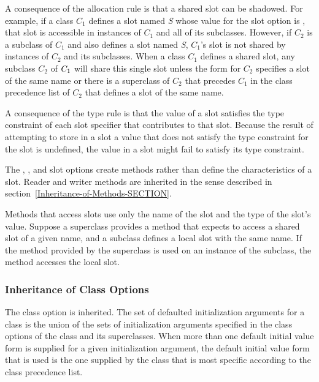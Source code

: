 A consequence of the allocation rule is that a shared slot can be
shadowed.  For example, if a class $C_1$ defines a slot named \emph{S}
whose value for the  slot option is ,
that slot is accessible in instances of $C_1$ and all of its
subclasses.  However, if $C_2$ is a subclass of $C_1$ and also
defines a slot named \emph{S}, $C_1$'s slot is not shared
by instances of $C_2$ and its subclasses. When a class
$C_1$ defines a shared slot, any subclass $C_2$ of $C_
1$ will share this single slot unless the  form for
$C_2$ specifies a slot of the same name or there is a superclass
of $C_2$ that precedes $C_1$ in the class precedence list of
$C_2$ that defines a slot of the same name.

A consequence of the type rule is that the value of a slot satisfies
the type constraint of each slot specifier that contributes to that
slot.  Because the result of attempting to store in a slot a value
that does not satisfy the type constraint for the slot is undefined,
the value in a slot might fail to satisfy its type constraint.

The , , and  slot options
create methods rather than define the characteristics of a slot.
Reader and writer  methods are inherited in the sense described in
section~\ref{Inheritance-of-Methods-SECTION}. 

Methods that access slots use only the name of the slot and the type
of the slot's value.  Suppose a superclass provides a method that
expects to access a shared slot of a given name, and a subclass defines
a local slot with the same name.  If the method provided by the
superclass is used on an instance of the subclass, the method accesses
the local slot.

\subsubsection{Inheritance of Class Options}

The  class option is inherited.  The set of
defaulted initialization arguments for a class is the union of the
sets of initialization arguments specified in the 
 class options of the class and its superclasses.
When more than one default initial value form is supplied for a given
initialization argument, the default initial value form that is used
is the one supplied by the class that is most specific according to
the class precedence list.


